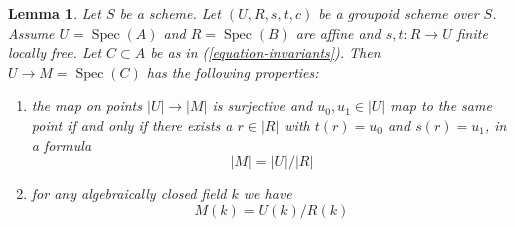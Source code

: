 \documentclass{amsart}
\theoremstyle{plain}
\newtheorem{lemma}[subsection]{Lemma}
\theoremstyle{definition}
\theoremstyle{remark}
\numberwithin{equation}{subsection}
\def\Spec{\mathop{\mathrm{Spec}}}
\begin{document}
\begin{lemma}
\label{lemma-points}
Let $S$ be a scheme. Let $(U, R, s, t, c)$ be a groupoid scheme over $S$.
Assume $U = \Spec(A)$ and $R = \Spec(B)$ are affine and
$s, t : R \to U$ finite locally free. Let $C \subset A$ be as in
(\ref{equation-invariants}). Then $U \to M = \Spec(C)$ has
the following properties:
\begin{enumerate}
\item the map on points $|U| \to |M|$ is surjective and
$u_0, u_1 \in |U|$ map to the same point if and only if
there exists a $r \in |R|$ with $t(r) = u_0$ and $s(r) = u_1$, in
a formula
$$
|M| = |U|/|R|
$$
\item for any algebraically closed field $k$ we have
$$
M(k) = U(k)/R(k)
$$
\end{enumerate}
\end{lemma}
\end{document}
